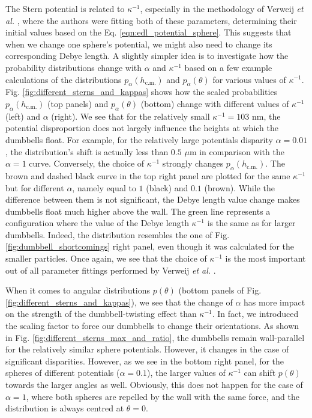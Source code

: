 \documentclass{master_thesis}
\begin{document}
The Stern potential is related to $\kappa^{-1}$, especially in the methodology of Verweij \textit{et al.} \cite{verweij2021}, where the authors were fitting both of these parameters, determining their initial values based on the Eq. \eqref{eqn:edl_potential_sphere}. This suggests that when we change one sphere's potential, we might also need to change its corresponding Debye length. A slightly simpler idea is to investigate how the probability distributions change with $\alpha$ and $\kappa^{-1}$ based on a few example calculations of the distributions $p_{\alpha}(h_{\textrm{c.m.}})$ and $p_{\alpha}(\theta)$ for various values of $\kappa^{-1}$. Fig. \ref{fig:different_sterns_and_kappas} shows how the scaled probabilities $p_{\alpha}(h_{\textrm{c.m.}})$ (top panels) and $p_\alpha(\theta)$ (bottom) change with different values of $\kappa^{-1}$ (left) and $\alpha$ (right). We see that for the relatively small $\kappa^{-1}=103$ nm, the potential disproportion does not largely influence the heights at which the dumbbells float. For example, for the relatively large potentials disparity $\alpha=0.01$, the distribution's shift is actually less than $0.5$ $\mu$m in comparison with the $\alpha=1$ curve. Conversely, the choice of $\kappa^{-1}$ strongly changes $p_{\alpha}(h_{\textrm{c.m.}})$. The brown and dashed black curve in the top right panel are plotted for the same $\kappa^{-1}$ but for different $\alpha$, namely equal to $1$ (black) and $0.1$ (brown). While the difference between them is not significant, the Debye length value change makes dumbbells float much higher above the wall. The green line represents a configuration where the value of the Debye length $\kappa^{-1}$ is the same as for larger dumbbells. Indeed, the distribution resembles the one of Fig. \ref{fig:dumbbell_shortcomings} right panel, even though it was calculated for the smaller particles. Once again, we see that the choice of $\kappa^{-1}$ is the most important out of all parameter fittings performed by Verweij \textit{et al.} \cite{verweij2021}.

When it comes to angular distributions $p(\theta)$ (bottom panels of Fig. \ref{fig:different_sterns_and_kappas}), we see that the change of $\alpha$ has more impact on the strength of the dumbbell-twisting effect than $\kappa^{-1}$. In fact, we introduced the scaling factor to force our dumbbells to change their orientations. As shown in Fig. \ref{fig:different_sterns_max_and_ratio}, the dumbbells remain wall-parallel for the relatively similar sphere potentials. However, it changes in the case of significant disparities. However, as we see in the bottom right panel, for the spheres of different potentials ($\alpha=0.1$), the larger values of $\kappa^{-1}$ can shift $p(\theta)$ towards the larger angles as well. Obviously, this does not happen for the case of $\alpha=1$, where both spheres are repelled by the wall with the same force, and the distribution is always centred at $\theta=0$.
\end{document}

